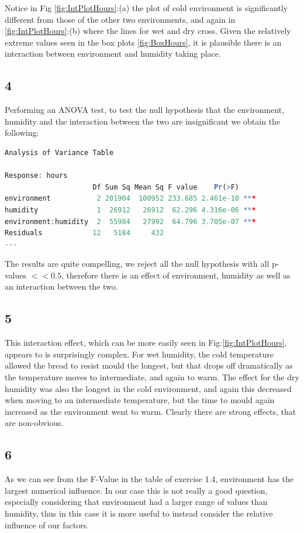 \documentclass{article}
\begin{document}
Notice in Fig \ref{fig:IntPlotHours}:(a) the plot of cold environment is significantly different from those of the other two environments, and again in \ref{fig:IntPlotHours}:(b) where the lines for wet and dry cross. Given the relatively extreme values seen in the box plots \ref{fig:BoxHours}, it is plausible there is an interaction between environment and humidity taking place.     
    
    \subsection*{4}
    Performing an ANOVA test, to test the null hypothesis that the environment, humidity and the interaction between the two are insignificant we obtain the following:
      \begin{lstlisting}[language=R]
Analysis of Variance Table

Response: hours
                     Df Sum Sq Mean Sq F value    Pr(>F)    
environment           2 201904  100952 233.685 2.461e-10 ***
humidity              1  26912   26912  62.296 4.316e-06 ***
environment:humidity  2  55984   27992  64.796 3.705e-07 ***
Residuals            12   5184     432                      
---
      \end{lstlisting}
The results are quite compelling, we reject all the null hypothesis with all p-values $<< 0.5$, therefore there is an effect of environment, humidity as well as an interaction between the two.    
    
    \subsection*{5}
    This interaction effect, which can be more easily seen in Fig:\ref{fig:IntPlotHours}, appears to is surprisingly complex. For wet humidity, the cold temperature allowed the bread to resist mould the longest, but that drops off dramatically as the temperature moves to intermediate, and again to warm. The effect for the dry humidity was also the longest in the cold environment, and again this decreased when moving to an intermediate temperature, but the time to mould again increased as the environment went to warm. Clearly there are strong effects, that are non-obvious.
    
    \subsection*{6}
    As we can see from the F-Value in the table of exercise 1.4, environment has the largest numerical influence. In our case this is not really a good question, especially considering that environment had a larger range of values than humidity, thus in this case it is more useful to instead consider the relative influence of our factors.
      
\end{document}
